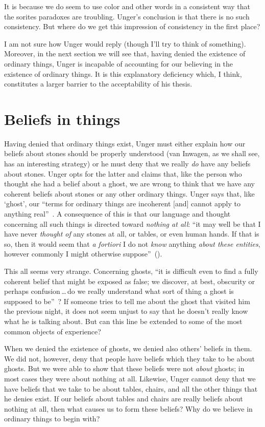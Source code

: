 \documentclass[11pt]{standalone} \newif\ifstandlone \standalonetrue
\begin{document}
\begin{spacing}{1.5}
It is because we do seem to use color and other words in a consistent
way that the sorites paradoxes are troubling.  Unger's conclusion is
that there is no such consistency.  But where do we get this
impression of consistency in the first place?

I am not sure how Unger would reply (though I'll try to think of
something).  Moreover, in the next section we will see that, having
denied the existence of ordinary things, Unger is incapable of
accounting for our believing in the existence of ordinary things.  It
is this explanatory deficiency which, I think, constitutes a larger
barrier to the acceptability of his thesis.

\section{Beliefs in things}
Having denied that ordinary things exist, Unger must either explain
how our beliefs about stones should be properly understood (van
Inwagen, as we shall see, has an interesting strategy) or he must deny
that we really {\em do} have any beliefs about stones.  Unger opts for
the latter and claims that, like the person who thought she had a
belief about a ghost, we are wrong to think that we have any coherent
beliefs about stones or any other ordinary things.  Unger says that,
like `ghost', our ``terms for ordinary things are incoherent [and]
cannot apply to anything real''~\citep[147]{unger1979}.  A consequence
of this is that our language and thought concerning all such things is
directed toward {\em nothing at all}: ``it may well be that I have
never {\em thought of} any stones at all, or tables, or even human
hands.  If that is so, then it would seem that {\em a fortiori} I do
not {\em know} anything {\em about these entities}, however commonly I
might otherwise suppose''~(\citeyear[458]{unger1980a}).

This all seems very strange.  Concerning ghosts, ``it is difficult
even to find a fully coherent belief that might be exposed as false;
we discover, at best, obscurity or perhaps confusion\,\ldots\,do we
really understand what sort of thing a ghost is supposed to
be''~\citep[76]{stroud2000a}?  If someone tries to tell me about the
ghost that visited him the previous night, it does not seem unjust to
say that he doesn't really know what he is talking about.  But can
this line be extended to some of the most common objects of
experience?

When we denied the existence of ghosts, we denied also others' beliefs
in them.  We did not, however, deny that people have beliefs which
they take to be about ghosts.  But we were able to show that these
beliefs were not {\em about} ghosts; in most cases they were about
nothing at all.  Likewise, Unger cannot deny that we have beliefs that
we take to be about tables, chairs, and all the other things that he
denies exist.  If our beliefs about tables and chairs are really
beliefs about nothing at all, then what causes us to form these
beliefs?  Why do we believe in ordinary things to begin with?


\end{spacing}
\end{document}
